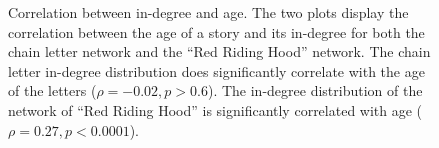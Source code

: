 \begin{figure}
\centering
{}
\caption{Correlation between in-degree and age. The two plots display the correlation between the age of a story and its in-degree for both the chain letter network and the ``Red Riding Hood'' network. The chain letter in-degree distribution does significantly correlate with the age of the letters ($\rho=-0.02, p > 0.6$). The in-degree distribution of the network of ``Red Riding Hood'' is significantly correlated with age ($\rho=0.27, p < 0.0001$).}
\label{fig:correlation-degree-age}
\end{figure} 


